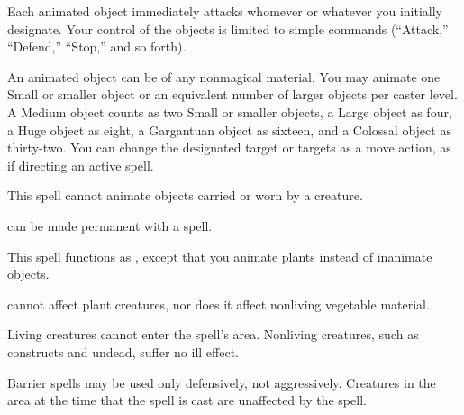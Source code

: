 \spellrng{\rngmed}
\spelldur{\durshort}
\begin{spelleffect}
  Each animated object immediately attacks whomever or whatever you initially designate. Your control of the objects is limited to simple commands (``Attack,'' ``Defend,'' ``Stop,'' and so forth).
  \par An animated object can be of any nonmagical material. You may animate one Small or smaller object or an equivalent number of larger objects per caster level. A Medium object counts as two Small or smaller objects, a Large object as four, a Huge object as eight, a Gargantuan object as sixteen, and a Colossal object as thirty-two. You can change the designated target or targets as a move action, as if directing an active spell.
\end{spelleffect}
\begin{spellnotes}
  This spell cannot animate objects carried or worn by a creature.
  \par {} can be made permanent with a  spell.
\end{spellnotes}

\begin{spelleffect}
  This spell functions as , except that you animate plants instead of inanimate objects.
\end{spelleffect}
\begin{spellnotes}
   cannot affect plant creatures, nor does it affect nonliving vegetable material.
\end{spellnotes}

\begin{spelleffect}
  Living creatures cannot enter the spell's area. Nonliving creatures, such as constructs and undead, suffer no ill effect.
\end{spelleffect}
\begin{spellnotes}
  Barrier spells may be used only defensively, not aggressively. Creatures in the area at the time that the spell is cast are unaffected by the spell.
\end{spellnotes}

